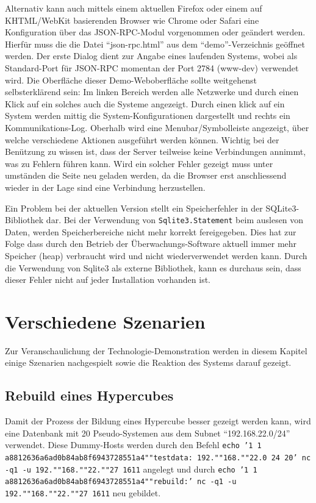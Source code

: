 Alternativ kann auch mittels einem aktuellen Firefox oder einem auf KHTML/WebKit basierenden Browser wie Chrome oder Safari eine Konfiguration \"uber das JSON-RPC-Modul vorgenommen oder ge\"andert werden. Hierf\"ur muss die die Datei "`json-rpc.html"' aus dem "`demo"'-Verzeichnis ge\"offnet werden. Der erste Dialog dient zur Angabe eines laufenden Systems, wobei als Standard-Port f\"ur JSON-RPC momentan der Port 2784 (www-dev) verwendet wird. Die Oberfl\"ache dieser Demo-Weboberfl\"ache sollte weitgehenst selbsterkl\"arend sein: Im linken Bereich werden alle Netzwerke und durch einen Klick auf ein solches auch die Systeme angezeigt. Durch einen klick auf ein System werden mittig die System-Konfigurationen dargestellt und rechts ein Kommunikations-Log. Oberhalb wird eine Menubar/Symbolleiste angezeigt, \"uber welche verschiedene Aktionen ausgef\"uhrt werden k\"onnen. Wichtig bei der Ben\"utzung zu wissen ist, dass der Server teilweise keine Verbindungen annimmt, was zu Fehlern f\"uhren kann. Wird ein solcher Fehler gezeigt muss unter umst\"anden die Seite neu geladen werden, da die Browser erst anschliessend wieder in der Lage sind eine Verbindung herzustellen.

Ein Problem bei der aktuellen Version stellt ein Speicherfehler in der SQLite3-Bibliothek dar. Bei der Verwendung von \texttt{Sqlite3.Statement} beim auslesen von Daten, werden Speicherbereiche nicht mehr korrekt fereigegeben. Dies hat zur Folge dass durch den Betrieb der \"Uberwachungs-Software aktuell immer mehr Speicher (heap) verbraucht wird und nicht wiederverwendet werden kann. Durch die Verwendung von Sqlite3 als externe Bibliothek, kann es durchaus sein, dass dieser Fehler nicht auf jeder Installation vorhanden ist.

\section{Verschiedene Szenarien} \label{sec:praxis-businesscases}
Zur Veranschaulichung der Technologie-Demonstration werden in diesem Kapitel einige Szenarien nachgespielt sowie die Reaktion des Systems darauf gezeigt.

\subsection{Rebuild eines Hypercubes}
Damit der Prozess der Bildung eines Hypercube besser gezeigt werden kann, wird eine Datenbank mit 20 Pseudo-Systemen aus dem Subnet "`192.168.22.0/24"' verwendet. Diese Dummy-Hosts werden durch den Befehl \texttt{echo '1   1   a8812636a6ad0b84ab8f6943728551a4""testdata: 192.""168.""22.0 24 20' \textbar nc -q1 -u 192.""168.""22.""27 1611} angelegt und durch \texttt{echo '1   1   a8812636a6ad0b84ab8f6943728551a4""rebuild:' \textbar nc -q1 -u 192.""168.""22.""27 1611} neu gebildet.

